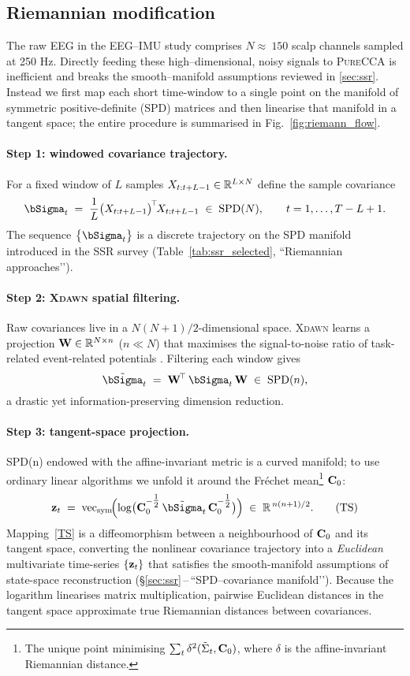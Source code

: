 \documentclass[14pt]{extarticle}
\begin{document}
	\subsection{Riemannian modification}
	\label{subsec:riemannian}
	
	The raw EEG in the EEG–IMU study comprises $N \approx\ 150$ scalp channels sampled at 250 Hz.
	Directly feeding these high–dimensional, noisy signals to
	\textsc{PureCCA} is inefficient and breaks the smooth–manifold
	assumptions reviewed in \ref{sec:ssr}.  
	Instead we first map each short time-window to a single point on the manifold of symmetric positive-definite (SPD) matrices and then
	linearise that manifold in a tangent space; the entire procedure is
	summarised in Fig.~\ref{fig:riemann_flow}.
	
	\paragraph{Step 1: windowed covariance trajectory.}
	For a fixed window of $L$ samples
	$X_{t:t+L-1}\in\mathbb{R}^{L\times N}$ define the sample covariance
	\[
	\bSigma_t
	\;=\;
	\frac1L \bigl(X_{t:t+L-1}\bigr)^{\!\top}\!X_{t:t+L-1}
	\;\in\;
	\mathrm{SPD}(N),\qquad
	t = 1,\dots,T-L+1 .
	\]
	The sequence $\bigl\{\bSigma_t\bigr\}$ is a discrete trajectory on the
	SPD manifold introduced in the SSR survey
	(Table~\ref{tab:ssr_selected}, “Riemannian approaches’’).
	
	\paragraph{Step 2: \textsc{Xdawn} spatial filtering.}
	Raw covariances live in a $N(N+1)/2$-dimensional space.
	\textsc{Xdawn} learns a projection %
	$\mathbf{W}\in\mathbb{R}^{N\times n}$ ($n\!\ll\!N$) that maximises the
	signal-to-noise ratio of task-related event-related potentials
	\citep{rivet2009xdawn}.  Filtering each window gives
	\[
	\tilde{\bSigma}_t
	\;=\;
	\bW^{\!\top}\,\bSigma_t\,\bW
	\;\in\;
	\mathrm{SPD}(n),
	\]
	a drastic yet information-preserving dimension reduction.
	
	\paragraph{Step 3: tangent-space projection.}
	SPD(n) endowed with the affine-invariant metric is a curved manifold;
	to use ordinary linear algorithms we unfold it around the Fréchet
	mean\footnote{The unique point minimising
		$\sum_t \delta^2(\tilde{\Sigma}_t,\mathbf{C}_0)$, where
		$\delta$ is the affine-invariant Riemannian distance.}
	$\mathbf{C}_0$:
	\[
	\bz_t
	\;=\;
	\operatorname{vec}_{\mathrm{sym}}\!
	\Bigl(
	\log\bigl(\bC_0^{-\tfrac12}\,
	\tilde{\bSigma}_t\,
	\bC_0^{-\tfrac12}\bigr)
	\Bigr)
	\;\in\;
	\R^{\,n(n+1)/2}.
	\tag{TS}
	\]
	Mapping~\eqref{TS} is a diffeomorphism between a neighbourhood of
	$\mathbf{C}_0$ and its tangent space, converting the nonlinear covariance
	trajectory into a \emph{Euclidean} multivariate time-series
	$\{\mathbf{z}_t\}$ that satisfies the smooth-manifold assumptions of
	state-space reconstruction (\S\ref{sec:ssr}\,–\,“SPD–covariance
	manifold’’).  Because the logarithm linearises matrix multiplication,
	pairwise Euclidean distances in the tangent space approximate true
	Riemannian distances between covariances.
	
\end{document}
